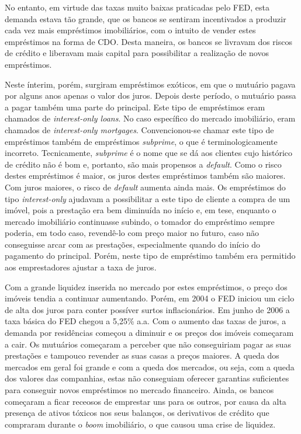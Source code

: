\documentclass[
	12pt,				%
	oneside,			%
	a4paper,			%
	chapter=TITLE,		%
	section=TITLE,		%
	english,			%
	brazil				%
	]{abntex2}
\begin{document}
No entanto, em virtude das taxas muito baixas praticadas pelo \gls{FED}, esta
demanda estava tão grande, que os bancos se sentiram incentivados a produzir
cada vez mais empréstimos imobiliários, com o intuito de vender estes
empréstimos na forma de \gls{CDO}. Desta maneira, os bancos se livravam dos
riscos de crédito e liberavam mais capital para possibilitar a realização de
novos empréstimos.

Neste ínterim, porém, surgiram empréstimos exóticos, em que o mutuário pagava
por alguns anos apenas o valor dos juros. Depois deste período, o mutuário passa
a pagar também uma parte do principal. Este tipo de empréstimos eram chamados
de \emph{interest-only loans}. No caso específico do mercado imobiliário, eram
chamados de \emph{interest-only mortgages}. Convencionou-se chamar este tipo de
empréstimos também de empréstimos \emph{subprime}, o que é terminologicamente
incorreto. Tecnicamente, \emph{subprime} é o nome que se dá aos clientes cujo
histórico de crédito não é bom e, portanto, são mais propensos a \emph{default}. Como
o risco destes empréstimos é maior, os juros destes empréstimos também são
maiores. Com juros maiores, o risco de \emph{default} aumenta ainda mais. Os
empréstimos do tipo \emph{interest-only} ajudavam a possibilitar a este tipo de
cliente a compra de um imóvel, pois a prestação era bem diminuída no início e,
em tese, enquanto o mercado imobiliário continuasse subindo, o tomador do
empréstimo sempre poderia, em todo caso, revendê-lo com preço maior no futuro,
caso não conseguisse arcar com as prestações, especialmente quando do início do
pagamento do principal. Porém, neste tipo de empréstimo também era permitido aos
emprestadores ajustar a taxa de juros.

Com a grande liquidez inserida no mercado por estes empréstimos, o preço dos
imóveis tendia a continuar aumentando. Porém, em 2004 o \gls{FED} iniciou um
ciclo de alta dos juros para conter possíver surtos inflacionários. Em junho de
2006 a taxa básica do \gls{FED} chegou a 5,25\% a.a. Com o aumento das taxas de
juros, a demanda por residências começou a diminuir e os preços dos imóveis
começaram a cair. Os mutuários começaram a perceber que não conseguiriam
pagar as suas prestações e tampouco revender as suas casas a preços maiores. A
queda dos mercados em geral foi grande e com a queda dos mercados, ou seja, com
a queda dos valores das companhias, estas não conseguiam oferecer garantias
suficientes para conseguir novos empréstimos no mercado financeiro. Ainda, os
bancos começaram a ficar receosos de emprestar uns para os outros, por causa
da alta presença de ativos tóxicos nos seus balanços, os derivativos de crédito
que compraram durante o \emph{boom} imobiliário, o que causou uma crise de liquidez.
\end{document}
